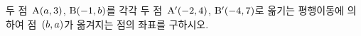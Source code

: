 두 점~$\mathrm{A}(a{,}\mkern3mu\mathopen{}3)$, $\mathrm{B}(-1{,}\mkern3mu\mathopen{}b)$를 각각 두 점~$\mathrm{A'}(-2{,}\mkern3mu\mathopen{}4)$, $\mathrm{B'}(-4{,}\mkern3mu\mathopen{}7)$로 옮기는 평행이동에 의하여 점~$(b{,}\mkern3mu\mathopen{}a)$가 옮겨지는 점의 좌표를 구하시오.
